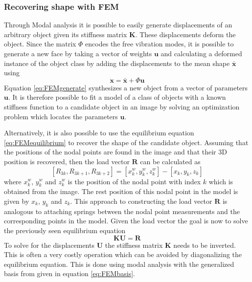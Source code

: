 \documentclass[11pt,a4paper]{report}
\begin{document}
\subsubsection{Recovering shape with FEM} 
Through Modal analysis it is possible to easily generate displacements of an
arbitrary object given its
stiffness matrix $\mathbf{K}$. These displacements deform the object. Since the
matrix $\Phi$ encodes the free vibration modes, it is possible to generate a new
face by taking a vector of weights $\mathbf{u}$ and calculating a deformed
instance of the object class by adding the displacements to the mean shape
$\mathbf{\bar{x}}$ using
\begin{equation}\label{eq:FEMgenerate}
\mathbf{x} =  \mathbf{\bar{x}} + \Phi\mathbf{u}
\end{equation}
Equation \ref{eq:FEMgenerate} synthesizes a new object from a vector of
parameters $\mathbf{u}$. It is therefore possible to fit a model of a class
of objects with a known stiffness function to a candidate object in an
image by solving an optimization problem which locates the parameters $\mathbf{u}$.

Alternatively, it is also possible to use the equilibrium equation
\ref{eq:FEMequilibrium} to recover the shape of the candidate object. Assuming
that the positions of the nodal points are found in the image and that their 3D
position is recovered, then the load vector $\mathbf{R}$ can be calculated as
\begin{equation}\label{eq:FEMload}
[R_{3k}, R_{3k+1}, R_{3k+2}] = [x^w_{k}, y^w_{k}, z^w_{k}] - [x_{k}, y_{k},
  z_{k}]
\end{equation}
where $x^w_{k}$, $y^w_{k}$ and $z^w_{k}$ is the position of the nodal point
with index $k$ which is obtained from the image. The rest position of this nodal point in the model is given by
$x_{k}$, $y_{k}$ and $z_{k}$. This approach to constructing the load vector
$\mathbf{R}$ is analogous to attaching springs between the nodal point
measurements and the corresponding points in the model. Given the load vector
the goal is now to solve the previously seen equilibrium equation 
\begin{equation}
\mathbf{K}\mathbf{U} = \mathbf{R}
\end{equation}
To solve for the displacements $\mathbf{U}$ the stiffness matrix $\mathbf{K}$
needs to be inverted. This is often a very costly operation which can be avoided
by diagonalizing the equilibrium equation. This is done using modal analysis
with the generalized
basis from given in equation \ref{eq:FEMbasis}.
\end{document}
